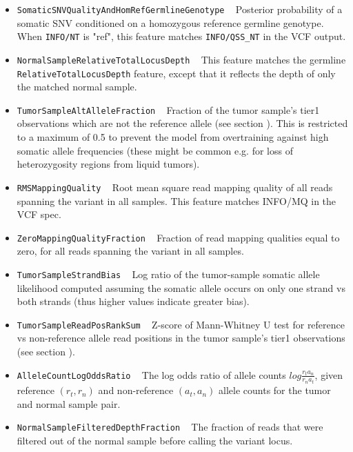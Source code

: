\documentclass{article}
\begin{document}
\begin{itemize}

    \item \texttt{SomaticSNVQualityAndHomRefGermlineGenotype} ~ Posterior probability of a somatic SNV conditioned on a homozygous reference germline genotype. When \texttt{INFO/NT} is "ref", this feature matches \texttt{INFO/QSS\_NT} in the VCF output.

    \item \texttt{NormalSampleRelativeTotalLocusDepth} ~ This feature matches the germline \texttt{RelativeTotalLocusDepth} feature, except that it reflects the depth of only the matched normal sample.

    \item \texttt{TumorSampleAltAlleleFraction} ~ Fraction of the tumor sample's tier1 observations which are not the reference allele (see section ). This is restricted to a maximum of 0.5 to prevent the model from overtraining against high somatic allele frequencies (these might be common e.g. for loss of heterozygosity regions from liquid tumors).

    \item \texttt{RMSMappingQuality} ~ Root mean square read mapping quality of all reads spanning the variant in all samples. This feature matches INFO/MQ in the VCF spec.

    \item \texttt{ZeroMappingQualityFraction} ~ Fraction of read mapping qualities equal to zero, for all reads spanning the variant in all samples.

    \item \texttt{TumorSampleStrandBias} ~ Log ratio of the tumor-sample somatic allele likelihood computed assuming the somatic allele occurs on only one strand vs both strands
    (thus higher values indicate greater bias).

    \item \texttt{TumorSampleReadPosRankSum} ~ Z-score of Mann-Whitney U test for reference vs non-reference allele read positions in the tumor sample's tier1 observations (see section ).

    \item \texttt{AlleleCountLogOddsRatio} ~ The log odds ratio of allele counts $log{\frac{r_t a_n} {r_n a_t}}$, given reference $(r_t,r_n)$ and non-reference $(a_t,a_n)$ allele counts for the tumor and normal sample pair.

    \item \texttt{NormalSampleFilteredDepthFraction} ~ The fraction of reads that were filtered out of the normal sample before calling the variant locus.


\end{itemize}
\end{document}
